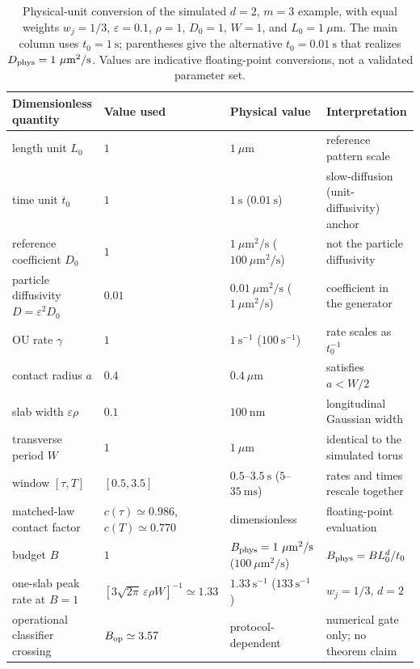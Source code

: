 \begin{table}[!t]
\caption{Physical-unit conversion of the simulated $d=2$, $m=3$ example,
with equal weights $w_j=1/3$, $\varepsilon=0.1$, $\rho=1$, $D_0=1$,
$W=1$, and $L_0=1~\mu\mathrm m$.  The main column uses $t_0=1~\mathrm s$;
parentheses give the alternative $t_0=0.01~\mathrm s$ that realizes
$D_{\rm phys}=1~\mu\mathrm m^2/\mathrm s$.  Values are indicative
floating-point conversions, not a validated parameter set.
\label{tab:units-mapping}}
\setlength{\tabcolsep}{1.4pt}
\begin{ruledtabular}
\begin{tabular}{@{}llll@{}}
Dimensionless quantity & Value used & Physical value & Interpretation\\
\hline
length unit $L_0$ & $1$ & $1~\mu\mathrm m$ & reference pattern scale\\
time unit $t_0$ & $1$ & $1~\mathrm s$ ($0.01~\mathrm s$) & slow-diffusion (unit-diffusivity) anchor\\
reference coefficient $D_0$ & $1$ & $1~\mu\mathrm m^2/\mathrm s$ ($100~\mu\mathrm m^2/\mathrm s$) & not the particle diffusivity\\
particle diffusivity $D=\varepsilon^2D_0$ & $0.01$ & $0.01~\mu\mathrm m^2/\mathrm s$ ($1~\mu\mathrm m^2/\mathrm s$) & coefficient in the generator\\
OU rate $\gamma$ & $1$ & $1~\mathrm s^{-1}$ ($100~\mathrm s^{-1}$) & rate scales as $t_0^{-1}$\\
contact radius $a$ & $0.4$ & $0.4~\mu\mathrm m$ & satisfies $a<W/2$\\
slab width $\varepsilon\rho$ & $0.1$ & $100~\mathrm{nm}$ & longitudinal Gaussian width\\
transverse period $W$ & $1$ & $1~\mu\mathrm m$ & identical to the simulated torus\\
window $[\tau,T]$ & $[0.5,3.5]$ & $0.5$--$3.5~\mathrm s$ ($5$--$35~\mathrm{ms}$) & rates and times rescale together\\
matched-law contact factor & $c(\tau)\simeq0.986$, $c(T)\simeq0.770$ & dimensionless & floating-point evaluation\\
budget $B$ & $1$ & $B_{\rm phys}=1~\mu\mathrm m^2/\mathrm s$ ($100~\mu\mathrm m^2/\mathrm s$) & $B_{\rm phys}=B L_0^d/t_0$\\
one-slab peak rate at $B=1$ & $[3\sqrt{2\pi}\,\varepsilon\rho W]^{-1}\simeq1.33$ & $1.33~\mathrm s^{-1}$ ($133~\mathrm s^{-1}$) & $w_j=1/3$, $d=2$\\
operational classifier crossing & $B_{\rm op}\simeq3.57$ & protocol-dependent & numerical gate only; no theorem claim\\
\end{tabular}
\end{ruledtabular}
\end{table}
